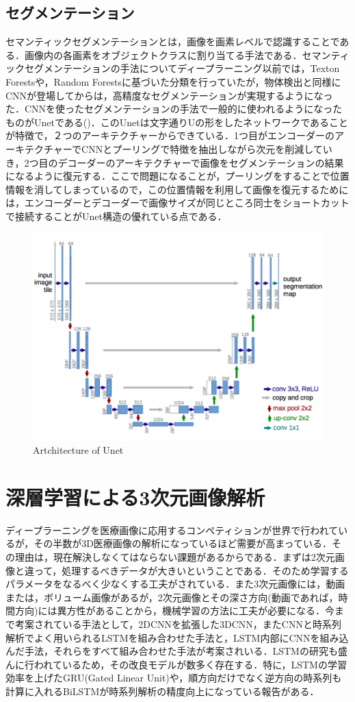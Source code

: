 \subsection*{セグメンテーション}
セマンティックセグメンテーションとは，画像を画素レベルで認識することである．画像内の各画素をオブジェクトクラスに割り当てる手法である．セマンティックセグメンテーションの手法についてディープラーニング以前では，Texton Forestsや，Random Forestsに基づいた分類を行っていたが，物体検出と同様にCNNが登場してからは，高精度なセグメンテーションが実現するようになった．CNNを使ったセグメンテーションの手法で一般的に使われるようになったものがUnetである()．このUnetは文字通りUの形をしたネットワークであることが特徴で，２つのアーキテクチャーからできている．1つ目がエンコーダーのアーキテクチャーでCNNとプーリングで特徴を抽出しながら次元を削減していき，2つ目のデコーダーのアーキテクチャーで画像をセグメンテーションの結果になるように復元する．ここで問題になることが，プーリングをすることで位置情報を消してしまっているので，この位置情報を利用して画像を復元するためには，エンコーダーとデコーダーで画像サイズが同じところ同士をショートカットで接続することがUnet構造の優れている点である．

\begin{figure}[H]
	\centering
	\includegraphics[width=0.7\linewidth]{fig/unet.png}
	\caption{Artchitecture of Unet}
	\label{fig:Unet}
\end{figure}

\section{深層学習による3次元画像解析}
ディープラーニングを医療画像に応用するコンペティションが世界で行われているが，その半数が3D医療画像の解析になっているほど需要が高まっている．その理由は，現在解決しなくてはならない課題があるからである．まずは2次元画像と違って，処理するべきデータが大きいということである．そのため学習するパラメータをなるべく少なくする工夫がされている．また3次元画像には，動画または，ボリューム画像があるが，2次元画像とその深さ方向(動画であれば，時間方向)には異方性があることから，機械学習の方法に工夫が必要になる．今まで考案されている手法として，2DCNNを拡張した3DCNN，またCNNと時系列解析でよく用いられるLSTMを組み合わせた手法と，LSTM内部にCNNを組み込んだ手法，それらをすべて組み合わせた手法が考案されいる．LSTMの研究も盛んに行われているため，その改良モデルが数多く存在する．特に，LSTMの学習効率を上げたGRU(Gated Linear Unit)や，順方向だけでなく逆方向の時系列も計算に入れるBiLSTMが時系列解析の精度向上になっている報告がある．



